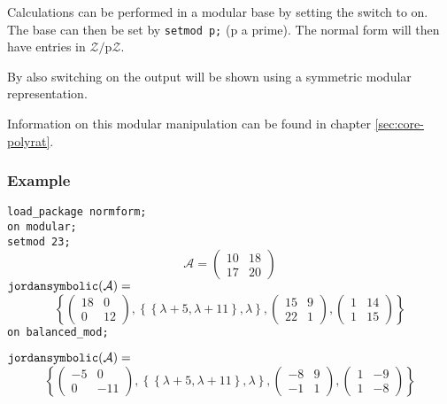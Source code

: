 Calculations can be performed in a modular base by setting the switch 
to on. The base can then be set by \texttt{setmod p;} (p a prime). The
normal form will then have entries in $\mathcal{Z}/$p$\mathcal{Z}$.

By also switching on  the output will be shown using
a symmetric modular representation.

Information on this modular manipulation can be found in chapter \ref{sec:core-polyrat}.

\subsubsection{Example}

\texttt{load\_package normform;} \\
\texttt{on modular;} \\
\texttt{setmod 23;}
\[
\mathcal{A} = \begin{pmatrix} 10 & 18 \\ 17 & 20 \end{pmatrix}
\]
\(
\texttt{jordansymbolic}(\mathcal{A}) =
\)
\[
\left\{
 \begin{pmatrix} 18 & 0 \\ 0 & 12 \end{pmatrix},
 \left\{ \left\{ \lambda + 5, \lambda + 11  \right\}, \lambda \right\},
         \begin{pmatrix} 15 & 9 \\ 22 & 1 \end{pmatrix},
         \begin{pmatrix} 1 & 14 \\ 1 & 15 \end{pmatrix} \right\}
\]
\texttt{on balanced\_mod;}

\(
\texttt{jordansymbolic}(\mathcal{A}) =
\)
\[
\left\{
  \begin{pmatrix} -5 & 0 \\ 0 & -11 \end{pmatrix},
  \left\{ \left\{ \lambda + 5, \lambda + 11  \right\}, \lambda \right\},
  \begin{pmatrix} -8 & 9 \\ -1 & 1 \end{pmatrix},
  \begin{pmatrix} 1 & -9 \\ 1 & -8 \end{pmatrix} \right\}
\]
